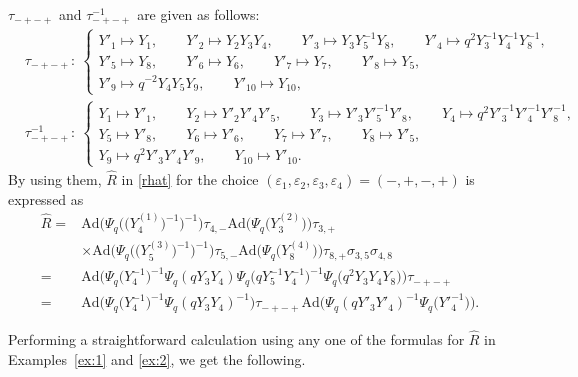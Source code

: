 \begin{Example}\label{ex:2}
$\tau_{-+-+}$ and $\tau_{-+-+}^{-1}$ are given as follows:
\begin{align*}
&\tau_{-+-+}\colon\
\begin{cases}
Y'_1 \mapsto Y_1,\qquad
Y'_2 \mapsto Y_2Y_3Y_4, \qquad
Y'_3 \mapsto Y_3Y^{-1}_5Y_8, \qquad
Y'_4 \mapsto q^2Y^{-1}_3Y^{-1}_4Y^{-1}_8,
\\
Y'_5 \mapsto Y_8, \qquad
Y'_6 \mapsto Y_6,\qquad
Y'_7 \mapsto Y_7,\qquad
Y'_8 \mapsto Y_5,
\\
Y'_9 \mapsto q^{-2}Y_4Y_5Y_9, \qquad
Y'_{10} \mapsto Y_{10},
\end{cases}
\\
& \tau_{-+-+}^{-1}\colon\
\begin{cases}
Y_1 \mapsto Y'_1, \qquad\!
Y_2 \mapsto Y'_2Y'_4Y'_5, \qquad\!
Y_3 \mapsto Y'_3Y'^{-1}_5Y'_8, \qquad\!
Y_4 \mapsto q^2Y'^{-1}_3Y'^{-1}_4Y'^{-1}_8,
\\
Y_5 \mapsto Y'_8, \qquad
Y_6 \mapsto Y'_6, \qquad
Y_7 \mapsto Y'_7, \qquad
Y_8 \mapsto Y'_5,
\\
Y_9 \mapsto q^2Y'_3Y'_4Y'_9, \qquad
Y_{10} \mapsto Y'_{10}.
\end{cases}
\end{align*}
By using them, $\widehat{R}$ in \eqref{rhat} for the choice
$(\varepsilon_1, \varepsilon_2, \varepsilon_3, \varepsilon_4)=(-,+,-,+)$
is expressed as
\begin{align}
\widehat{R}={}&
\mathrm{Ad}\bigl(\Psi_q\bigl(\bigl(Y^{(1)}_4\bigr)^{-1}\bigr)^{-1}\bigr)\tau_{4,-}
\mathrm{Ad}\bigl(\Psi_q\bigl(Y^{(2)}_3\bigr)\bigr)\tau_{3,+}
\nonumber \\
& \times
\mathrm{Ad}\bigl(\Psi_q\bigl(\bigl(Y^{(3)}_5\bigr)^{-1}\bigr)^{-1}\bigr)\tau_{5,-}
\mathrm{Ad}\bigl(\Psi_q\bigl(Y^{(4)}_8\bigr)\bigr)\tau_{8,+}\sigma_{3,5}\sigma_{4,8}
\nonumber \\
={}&
\mathrm{Ad}\bigl(\Psi_q\bigl(Y_4^{-1}\bigr)^{-1}
\Psi_q(qY_3Y_4)
\Psi_q\bigl(qY^{-1}_5Y^{-1}_4\bigr)^{-1}
\Psi_q\bigl(q^2Y_3Y_4Y_8\bigr)\bigr)\tau_{-+-+}
\label{dode1}\\
={}&
\mathrm{Ad}\bigl(
\Psi_q\bigl(Y_4^{-1}\bigr)^{-1}
\Psi_q(qY_3Y_4)^{-1}\bigr)
\tau_{-+-+}
\mathrm{Ad}\bigl(
\Psi_q(qY'_3Y'_4)^{-1}
\Psi_q\bigl(Y'^{-1}_4\bigr)\bigr).
\label{dode2}
\end{align}
\end{Example}

Performing a straightforward calculation using any one
of the formulas for $\widehat{R}$ in Examples~\ref{ex:1} and \ref{ex:2},
we get the following.

